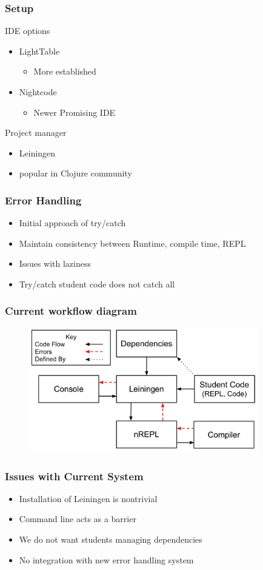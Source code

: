 \documentclass{beamer}
\begin{document}
\begin{frame}
\frametitle{Setup}
	IDE options
	\begin{itemize}
		\item LightTable
			\begin{itemize}
				\item More established
			\end{itemize}
		\item Nightcode
			\begin{itemize}
				\item Newer Promising IDE
			\end{itemize}
	\end{itemize}
	Project manager
	\begin{itemize}
		\item Leiningen
		\item popular in Clojure community
	\end{itemize}
\end{frame}

\begin{frame}
	\frametitle {Error Handling}
	\begin{itemize}
		\item Initial approach of try/catch
		\item Maintain consistency between Runtime, compile time, REPL
		\item Issues with laziness
		\item Try/catch student code does not catch all
	\end{itemize}
\end{frame}

\begin{frame}[fragile]
\frametitle{Current workflow diagram}
\begin{figure}[h]
 \includegraphics[width=10cm]{../CurrentErrorHandling.pdf}
 \centering
\end{figure}
\end{frame}

\begin{frame}
\frametitle{Issues with Current System}
	\begin{itemize}
		\item Installation of Leiningen is nontrivial
		\item Command line acts as a barrier
		\item We do not want students managing dependencies
		\item No integration with new error handling system
	\end{itemize} 
\end{frame}
\end{document}
